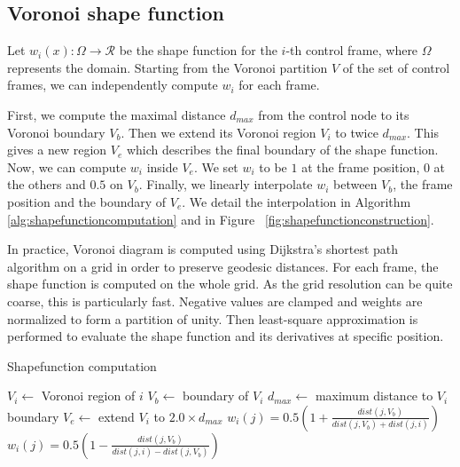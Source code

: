 \documentclass[11pt, oneside, a4paper]{memoir}
\begin{document}
\subsection{Voronoi shape function}

Let $w_{i}(x) : \Omega \rightarrow \mathcal{R}$ be the shape function for the $i$-th control frame, where $\Omega$ represents the domain. Starting from the Voronoi partition $V$ of the set of control frames, we can independently compute $w_{i}$ for each frame.

First, we compute the maximal distance $d_{max}$ from the control node to its Voronoi boundary $V_{b}$. Then we extend its Voronoi region $V_{i}$ to twice $d_{max}$. This gives a new region $V_{e}$ which describes the final boundary of the shape function. Now, we can compute $w_{i}$ inside $V_{e}$. We set $w_{i}$ to be $1$ at the frame position, $0$ at the others and $0.5$ on $V_{b}$. Finally, we linearly interpolate $w_{i}$ between $V_{b}$, the frame position and the boundary of $V_{e}$. We detail the interpolation in Algorithm~ \ref{alg:shapefunctioncomputation} and in Figure~ \ref{fig:shapefunctionconstruction}.

In practice, Voronoi diagram is computed using Dijkstra's shortest path algorithm on a grid in order to preserve geodesic distances. For each frame, the shape function is computed on the whole grid. As the grid resolution can be quite coarse, this is particularly fast. Negative values are clamped and weights are normalized to form a partition of unity. Then least-square approximation is performed to evaluate the shape function and its derivatives at specific position.

\begin{algorithm}[h]
\caption{\label{alg:shapefunctioncomputation}Shapefunction computation}
\begin{algorithmic}[1]
	\State $V_{i} \gets$ Voronoi region of $i$
	\State $V_{b} \gets$ boundary of $V_{i}$	
	\State $d_{max} \gets$ maximum distance to $V_{i}$ boundary
	\State $V_{e} \gets$ extend $V_{i}$ to $2.0 \times d_{max}$
	\State $\displaystyle w_{i}(j) = 0.5\left(1 + \frac{dist(j,V_{b})}{dist(j,V_{b})+dist(j,i)}\right)$
		\State $\displaystyle w_{i}(j) = 0.5\left(1 - \frac{dist(j,V_{b})}{dist(j,i)-dist(j,V_{b})}\right)$
	\EndIf
	\EndFor
\EndFor
\EndProcedure
\end{algorithmic}
\end{algorithm}
\end{document}
